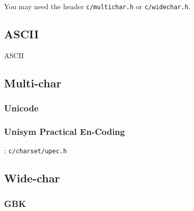 
You may need the header \verb|c/multichar.h| or \verb|c/widechar.h|.

\subsection{ASCII}

{ASCII}

\subsection{Multi-char}

\subsubsection{Unicode}



\subsubsection{Unisym Practical En-Coding}

: \verb`c/charset/upec.h`

\subsection{Wide-char}

\subsubsection{GBK}

